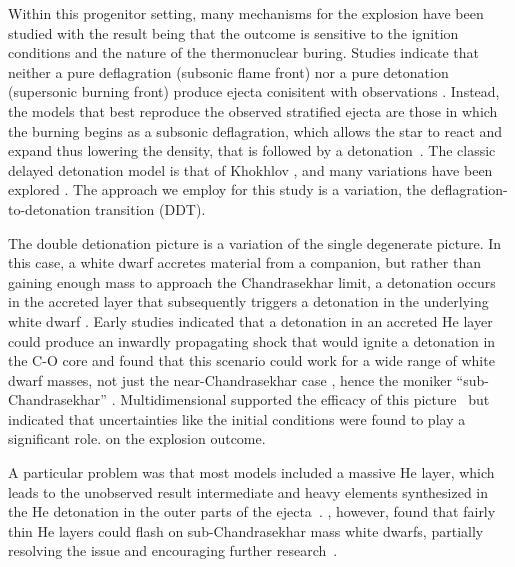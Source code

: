 \documentclass[iop,apj]{emulateapj}
\begin{document}
Within this progenitor setting, many mechanisms for the explosion have 
been studied with the result being that the outcome is sensitive to
the ignition conditions and the nature of the thermonuclear buring.
Studies indicate that neither a pure deflagration (subsonic flame front)
nor a pure detonation (supersonic burning front) produce ejecta conisitent
with observations \citep{arnett69,roepkeetal07}.
Instead, the models that best reproduce the observed
stratified ejecta are those in which the burning begins as a 
subsonic deflagration, which allows the star to react and expand
thus lowering the density, that is followed by a 
detonation~\citep{Nomo84,Khokhlov1991Delayed-detonat,HoefKhok96,GameKhokOran05}.
The classic delayed detonation model is that of 
Khokhlov \cite{Khokhlov1991Delayed-detonat,hoflich.khokhlov.ea:delayed,GameKhokOran05},
and many variations have been 
explored \cite[and references therein]{hillebrandtetal2013,calderetal2013}.
The approach we employ for this study is a variation, the deflagration-to-detonation
transition (DDT).


The double detionation picture is a variation of the single degenerate picture.
In this case, a white dwarf accretes material from a companion, but rather
than gaining enough mass to approach the Chandrasekhar limit, a detonation
occurs in the accreted layer that subsequently triggers a detonation
in the underlying white dwarf \citet{woosleyweavertaam80,taam80a,taam80b,
nomoto80,nomoto82b}. Early studies indicated that a detonation in an 
accreted He
layer could produce an inwardly propagating
shock that would ignite a detonation in the C-O core and found
that this scenario could work for a wide range of white dwarf
masses, not just the near-Chandrasekhar case \citep{livne90}, hence the
moniker ``sub-Chandrasekhar'' \citep{ww94}. Multidimensional supported the
efficacy of this picture~\citep{livneglasner91, livnearnett95,HoefKhok96,
hoeflichetal96, wigginsfalle97,wigginsetal98,garciasenzbravowoosley99} 
but indicated that uncertainties 
like the initial conditions were found to play a significant role.
on the explosion outcome. 

A particular problem was that most models 
included a massive He layer, which leads to 
the unobserved result intermediate and heavy elements synthesized in 
the He detonation in the outer parts of the ejecta~\citep{HoefKhok96, 
hoeflichetal96,finkhillebrandtroepke2007,simetal2010}.
\citet{bildstenetal2007}, however, found that fairly thin He layers
could flash on sub-Chandrasekhar
mass white dwarfs, partially resolving the issue and encouraging
further research~\citep{simetal2012,brooksetal2015, shenetal2018,
glasneretal2018}.
\end{document}
